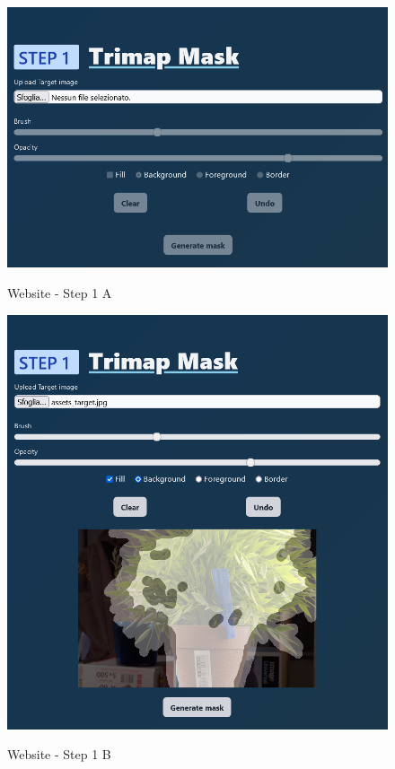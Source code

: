 \documentclass[a4paper]{article}
\begin{document}
\begin{figure}[h]
    \centering
    \begin{minipage}[b]{0.49\textwidth}
        \includegraphics[width=\textwidth]{website/step1A.png}
        \label{fig:fig1a}
        \caption{Website - Step 1 A}
    \end{minipage}
    \hfill
    \begin{minipage}[b]{0.49\textwidth}
        \includegraphics[width=\textwidth]{website/step1B.png}
        \label{fig:fig1b}
        \caption{Website - Step 1 B}
    \end{minipage}
\end{figure}
\end{document}
